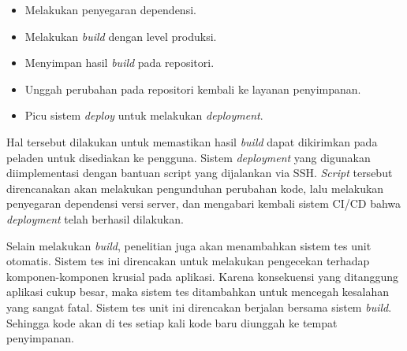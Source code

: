     \begin{itemize}
        \item Melakukan penyegaran dependensi.
        \item Melakukan \textit{build} dengan level produksi.
        \item Menyimpan hasil \textit{build} pada repositori.
        \item Unggah perubahan pada repositori kembali ke layanan penyimpanan.
        \item Picu sistem \textit{deploy} untuk melakukan \textit{deployment}.
    \end{itemize}
    
    Hal tersebut dilakukan untuk memastikan hasil \textit{build} dapat dikirimkan pada peladen untuk disediakan
    ke pengguna. Sistem \textit{deployment} yang digunakan diimplementasi dengan bantuan script yang dijalankan
    via SSH. \textit{Script} tersebut direncanakan akan melakukan pengunduhan perubahan kode, lalu melakukan
    penyegaran dependensi versi server, dan mengabari kembali sistem CI/CD bahwa \textit{deployment} telah
    berhasil dilakukan.
    
    Selain melakukan \textit{build}, penelitian juga akan menambahkan sistem tes unit otomatis. Sistem tes ini
    direncakan untuk melakukan pengecekan terhadap komponen-komponen krusial pada aplikasi. Karena konsekuensi
    yang ditanggung aplikasi cukup besar, maka sistem tes ditambahkan untuk mencegah kesalahan yang sangat
    fatal. Sistem tes unit ini direncakan berjalan bersama sistem \textit{build}. 
    Sehingga kode akan di tes setiap kali kode baru diunggah ke tempat penyimpanan.